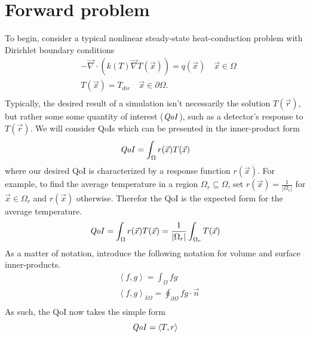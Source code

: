 \documentclass{article}
\newcommand{\vr}{\vec{r}}
\newcommand{\vx}{\vec{x}}
\newcommand{\bra}{\left\langle}
\newcommand{\ket}{\right\rangle}
\newcommand{\ketbd}{\right\rangle_{\delta \Omega}}
\renewcommand{\div}{\vec{\nabla} \cdot}
\newcommand{\grad}{\vec{\nabla}}
\newcommand{\qoi}{{\it QoI}\xspace}
\newcommand{\Tdir}{T_{dir}}
\begin{document}
\section{Forward problem}
To begin, consider a typical nonlinear steady-state heat-conduction problem with Dirichlet boundary conditions
\begin{equation}
\label{forwardSS}
\begin{split}
& - \div ( k(T) \grad T(\vx) ) = q(\vx) \quad \vx \in \Omega \\
&T(\vx)=\Tdir \quad \vx \in \partial \Omega .\\
\end{split}
\end{equation}
Typically, the desired result of a simulation isn't necessarily the solution $T(\vr)$, but rather some some quantity of interest ($\qoi$), such as a detector's response to $T(\vr)$. We will consider QoIs which can be presented in the inner-product form
\begin{equation}
\qoi = \int_{\Omega} r(\vx) T(\vx)
\end{equation}
where our desired QoI is characterized by a response function $r(\vx)$. For example, to find the average temperature in a region $\Omega_r \subseteq \Omega$, set $r(\vx)=\frac{1}{|\Omega_r|}$ for $\vx \in \Omega_r$ and $r(\vx)$ otherwise. Therefor the QoI is the expected form for the average temperature.
\begin{equation}
\qoi = \int_{\Omega} r(\vx) T(\vx) = \frac{1}{|\Omega_r|} \int_{\Omega_r} T(\vx) 
\end{equation}
As a matter of notation, introduce the following notation for volume and surface inner-products.
\begin{equation}
\begin{split}
&\bra f, g \ket = \int_\Omega f g \\
&\bra f, g \ketbd = \oint_{\partial \Omega} f g \cdot \vec{n} \\
\end{split}
\end{equation}
As such, the QoI now takes the simple form
\begin{equation}
\qoi = \bra T , r \ket
\end{equation}
\end{document}
